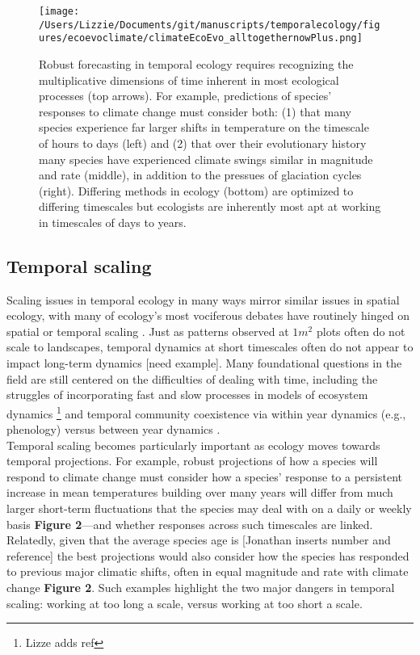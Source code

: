 \documentclass[11pt,a4paper,oneside]{article}
\begin{document}
\newpage
\begin{figure}[h!]
\centering
\noindent \texttt{[image: /Users/Lizzie/Documents/git/manuscripts/temporalecology/figures/ecoevoclimate/climateEcoEvo\_alltogethernowPlus.png]}
\caption{Robust forecasting in temporal ecology requires recognizing the multiplicative dimensions of time inherent in most ecological processes (top arrows). For example, predictions of species' responses to climate change must consider both: (1) that many species experience far larger shifts in temperature on the timescale of hours to days (left) and (2) that over their evolutionary history many species have experienced climate swings similar in magnitude and rate (middle), in addition to the pressues of glaciation cycles (right). Differing methods in ecology (bottom) are optimized to differing timescales but ecologists are inherently most apt at working in timescales of days to years.}
\end{figure}

\subsection{Temporal scaling}
Scaling issues in temporal ecology in many ways mirror similar issues in spatial ecology, with many of ecology's most vociferous debates have routinely hinged on spatial or temporal scaling \citep{wiens1986}. Just as patterns observed at $1m^2$ plots often do not scale to landscapes, temporal dynamics at short timescales often do not appear to impact long-term dynamics [need example]. Many foundational questions in the field are still centered on the difficulties of dealing with time, including the struggles of incorporating fast and slow processes in models of ecosystem dynamics \footnote{Lizze adds ref} and temporal community coexistence via within year dynamics (e.g., phenology) versus between year dynamics \citep{Chesson:1997dz}.\\

Temporal scaling becomes particularly important as ecology moves towards temporal projections. For example, robust projections of how a species will respond to climate change must consider how a species' response to a persistent increase in mean temperatures building over many years will differ from much larger short-term fluctuations that the species may deal with on a daily or weekly basis {\bf Figure 2}---and whether responses across such timescales are linked. Relatedly, given that the average species age is [Jonathan inserts number and reference] the best projections would also consider how the species has responded to previous major climatic shifts, often in equal magnitude and rate with climate change {\bf Figure 2}. Such examples highlight the two major dangers in temporal scaling: working at too long a scale, versus working at too short a scale.\\
\end{document}
